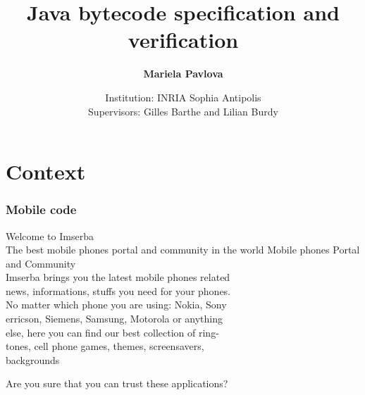 \documentclass{beamer}
\title[]{Java bytecode specification and verification}
\author[mariela.pavlova@sophia.inria.fr]{\textbf{Mariela Pavlova}}
\date[INRIA Sophia Antipolis ]{Institution: INRIA Sophia Antipolis\\
Supervisors: Gilles Barthe and Lilian Burdy}
\begin{document}
\begin{frame}
\titlepage
\end{frame}





\newcommand{\wpi}{\mbox{\rm\textit{wp}}}%
\newcommand{\Pred}{\mbox{\rm\texttt{Pred}}}
\newcommand{\program}{\mbox{\rm\texttt{P}}}%
\newcommand{\Method}{\mbox{\rm\texttt{Method}}}%
\newcommand{\methodd}{\mbox{\rm\textit{m}}}

%    



\section{Context}
\begin{frame}[shrink]
\frametitle{Mobile code}
Welcome to Imserba\bigskip\\

The best mobile phones portal and community in the world
Mobile phones Portal and Community\bigskip\\

Imserba brings you the latest mobile phones related \\
news, informations, stuffs you need for your phones. \\
No matter which phone you are using: Nokia, Sony\\
erricson, Siemens, Samsung, Motorola or anything\\ 
else, here you can find our best collection of ring- \\
tones, cell phone games, themes, screensavers,\\
backgrounds
\begin{center}
\end{center}
\alert{Are you sure that you can trust these applications?}
\end{frame}
\end{document}
